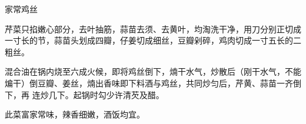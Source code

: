 %
%
%
%
%
%
%
\begin{recipe}{家常鸡丝}

\ingredients


\preparation

\step 芹菜只掐嫩心部分，去叶抽筋，蒜苗去须、去黄叶，均淘洗干净，用刀分别正切成
一寸长的节，蒜苗头划成四瓣，仔姜切成细丝，豆瓣剁碎，鸡肉切成一寸五长的二粗丝。

\step 混合油在锅内烧至六成火候，即将鸡丝倒下，煵干水气，炒散后（刚干水气，不能
煸干）倒豆瓣、姜丝，煵出香味即下料酒与鸡丝，共同炒匀后，芹黄、蒜苗一齐倒下，再
连炒几下。起锅时勾少许清芡及醋。

\features

此菜富家常味，辣香细嫩，酒饭均宜。

\end{recipe}

